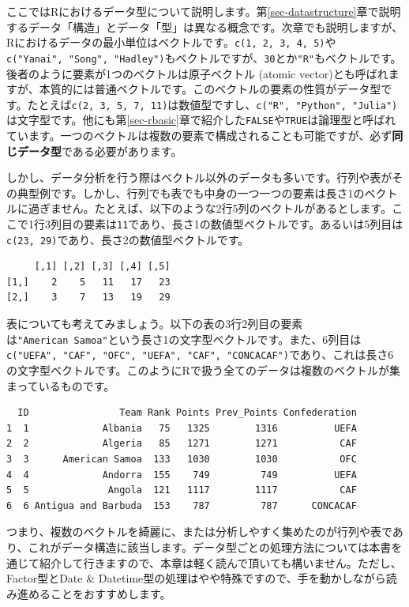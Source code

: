 \documentclass[
  a4paper,
  pandoc,
  ja=standard,
  jafont=haranoaji]{bxjsbook}
\begin{document}
ここではRにおけるデータ型について説明します。第\ref{sec-datastructure}章で説明するデータ「構造」とデータ「型」は異なる概念です。次章でも説明しますが、Rにおけるデータの最小単位はベクトルです。\texttt{c(1,\ 2,\ 3,\ 4,\ 5)}や\texttt{c("Yanai",\ "Song",\ "Hadley")}もベクトルですが、\texttt{30}とか\texttt{"R"}もベクトルです。後者のように要素が1つのベクトルは原子ベクトル
(atomic
vector)とも呼ばれますが、本質的には普通ベクトルです。このベクトルの要素の性質がデータ型です。たとえば\texttt{c(2,\ 3,\ 5,\ 7,\ 11)}は数値型ですし、\texttt{c("R",\ "Python",\ "Julia")}は文字型です。他にも第\ref{sec-rbasic}章で紹介した\texttt{FALSE}や\texttt{TRUE}は論理型と呼ばれています。一つのベクトルは複数の要素で構成されることも可能ですが、必ず\textbf{同じデータ型}である必要があります。

しかし、データ分析を行う際はベクトル以外のデータも多いです。行列や表がその典型例です。しかし、行列でも表でも中身の一つ一つの要素は長さ1のベクトルに過ぎません。たとえば、以下のような2行5列のベクトルがあるとします。ここで1行3列目の要素は\texttt{11}であり、長さ1の数値型ベクトルです。あるいは5列目は\texttt{c(23,\ 29)}であり、長さ2の数値型ベクトルです。

\begin{verbatim}
     [,1] [,2] [,3] [,4] [,5]
[1,]    2    5   11   17   23
[2,]    3    7   13   19   29
\end{verbatim}

表についても考えてみましょう。以下の表の3行2列目の要素は\texttt{"American\ Samoa"}という長さ1の文字型ベクトルです。また、6列目は\texttt{c("UEFA",\ "CAF",\ "OFC",\ "UEFA",\ "CAF",\ "CONCACAF")}であり、これは長さ6の文字型ベクトルです。このようにRで扱う全てのデータは複数のベクトルが集まっているものです。

\begin{verbatim}
  ID                Team Rank Points Prev_Points Confederation
1  1             Albania   75   1325        1316          UEFA
2  2             Algeria   85   1271        1271           CAF
3  3      American Samoa  133   1030        1030           OFC
4  4             Andorra  155    749         749          UEFA
5  5              Angola  121   1117        1117           CAF
6  6 Antigua and Barbuda  153    787         787      CONCACAF
\end{verbatim}

つまり、複数のベクトルを綺麗に、または分析しやすく集めたのが行列や表であり、これがデータ構造に該当します。データ型ごとの処理方法については本書を通じて紹介して行きますので、本章は軽く読んで頂いても構いません。ただし、Factor型とDate
\&
Datetime型の処理はやや特殊ですので、手を動かしながら読み進めることをおすすめします。
\end{document}
